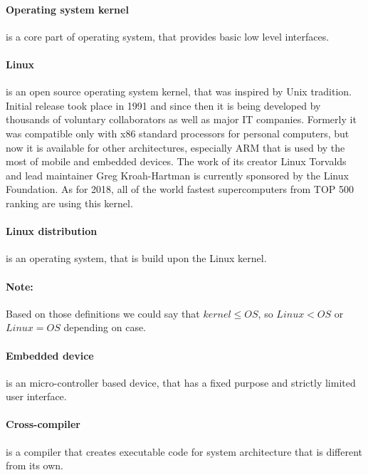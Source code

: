 \documentclass[printmode]{mgr}
\begin{document}
\paragraph{Operating system kernel} is a core part of operating system, that provides  basic low level interfaces.

\paragraph{Linux} is an open source operating system kernel, that was inspired by Unix tradition. Initial release took place in 1991 and since then it is being developed by thousands of voluntary collaborators as well as major IT companies. Formerly it was compatible only with x86 standard processors for personal computers, but now it is available for other architectures, especially ARM that is used by the most of mobile and embedded devices. The work of its creator Linux Torvalds and lead maintainer Greg Kroah-Hartman is currently sponsored by the Linux Foundation. As for 2018, all of the world fastest supercomputers from TOP 500 ranking are using this kernel.

\paragraph{Linux distribution} is an operating system, that is build upon the Linux kernel.

\paragraph{Note:} Based on those definitions we could say that $kernel \le OS$, so $Linux < OS$ or $Linux = OS$ depending on case.

\paragraph{Embedded device} is an micro-controller based device, that has a fixed purpose and strictly limited user interface.

\paragraph{Cross-compiler} is a compiler that creates executable code for system architecture that is different from its own.
\end{document}
